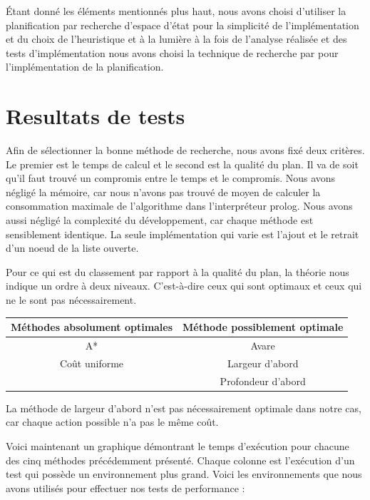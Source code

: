 \documentclass[12pt,english,frenchb,letterpaper]{article}
\begin{document}
Étant donné les éléments mentionnés plus haut, nous avons choisi d'utiliser la planification par recherche d'espace d'état pour la simplicité de l'implémentation et du choix de l'heuristique et à la lumière à la fois de l'analyse réalisée et des tests d'implémentation nous avons choisi la technique de recherche par %
pour l'implémentation de la planification.

\section{Resultats de tests}



Afin de sélectionner la bonne méthode de recherche, nous avons fixé deux critères. Le premier est le temps de calcul et le second est la qualité du plan. Il va de soit qu'il faut trouvé un compromis entre le temps et le compromis. Nous avons négligé la mémoire, car nous n'avons pas trouvé de moyen de calculer la consommation maximale de l'algorithme dans l'interpréteur prolog. Nous avons aussi négligé la complexité du développement, car chaque méthode est sensiblement identique. La seule implémentation qui varie est l'ajout et le retrait d'un noeud de la liste ouverte.

Pour ce qui est du classement par rapport à la qualité du plan, la théorie nous indique un ordre à deux niveaux. C'est-à-dire ceux qui sont optimaux et ceux qui ne le sont pas nécessairement.

\begin{center}
  \begin{tabular}{@{} cc @{}}
    \hline
    Méthodes absolument optimales & Méthode possiblement optimale\\ 
    \hline
    A* & Avare\\     
    Coût uniforme & Largeur d'abord \\
    &Profondeur d'abord\\
    \hline
  \end{tabular}
\end{center}

La méthode de largeur d'abord n'est pas nécessairement optimale dans notre cas, car chaque action possible n'a pas le même coût.

Voici maintenant un graphique démontrant le temps d'exécution pour chacune des cinq méthodes précédemment présenté. Chaque colonne est l'exécution d'un test qui possède un environnement plus grand. Voici les environnements que nous avons utilisés pour effectuer nos tests de performance :
\end{document}
